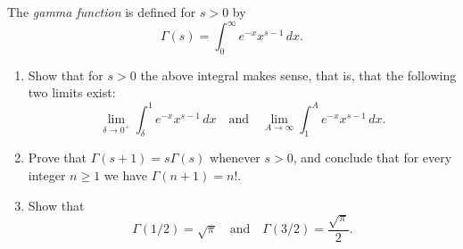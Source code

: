 \documentclass[12 pt, letterpaper]{hmcpset}
\begin{document}
\pagebreak

\begin{problem}[S \& S \S 5.5 \#17.]
	The \emph{gamma function} is defined for $s > 0$ by
	\[
		\Gamma(s) = \int_{0}^{\infty} e^{-x} x^{s - 1} \, dx.
	\]
	\begin{enumerate}
		\item Show that for $s > 0$ the above integral makes sense, that is, that the following two limits exist:
			\[
				\lim_{\delta \to 0^{+}} \int_{\delta}^{1} e^{-x} x^{s - 1} \, dx \quad \text{and} \quad \lim_{A \to \infty}  \int_{1}^{A} e^{-x} x^{s - 1} \, dx.
			\]

		\item Prove that $\Gamma(s + 1) = s \Gamma(s)$ whenever $s > 0$, and conclude that for every integer $n \ge 1$ we have $\Gamma(n + 1) = n!$.

		\item Show that
			\[
				\Gamma(1 / 2) = \sqrt{\pi} \quad \text{and} \quad \Gamma(3 / 2) = \frac{\sqrt{\pi}}{2}.
			\]
	\end{enumerate}
\end{problem}
\end{document}
